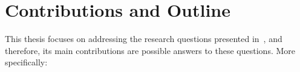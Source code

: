 










\section{Contributions and Outline}

This thesis focuses on addressing the research questions presented in~, and therefore, its main contributions are possible answers to these questions. More specifically:


